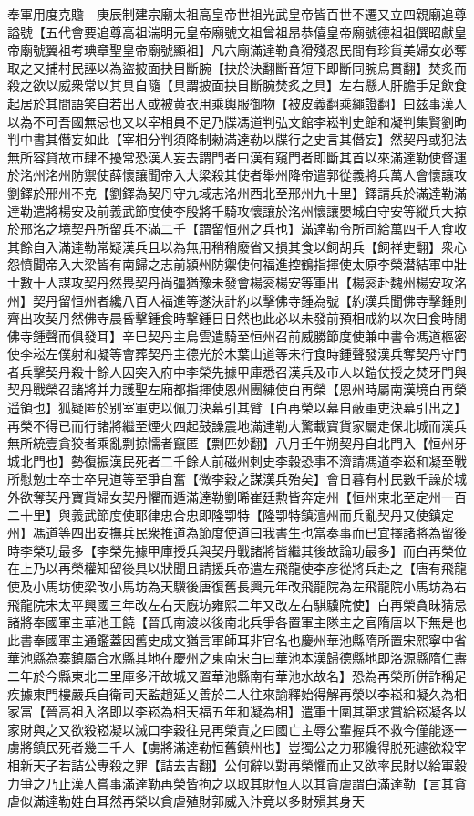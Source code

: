 奉軍用度克贍　庚辰制建宗廟太祖高皇帝世祖光武皇帝皆百世不遷又立四親廟追尊謚號【五代會要追尊高祖湍明元皇帝廟號文祖曾祖昂恭僖皇帝廟號德祖祖僎昭獻皇帝廟號翼祖考琠章聖皇帝廟號顯祖】凡六廟滿達勒貪猾殘忍民間有珍貨美婦女必奪取之又捕村民誣以為盜披面抉目斷腕【抉於決翻斷音短下即斷同腕烏貫翻】焚炙而殺之欲以威衆常以其具自隨【具謂披面抉目斷腕焚炙之具】左右懸人肝膽手足飲食起居於其間語笑自若出入或被黄衣用乘輿服御物【被皮義翻乘繩證翻】曰兹事漢人以為不可吾國無忌也又以宰相員不足乃牒馮道判弘文館李崧判史館和凝判集賢劉昫判中書其僭妄如此【宰相分判須降制勑滿達勒以牒行之史言其僭妄】然契丹或犯法無所容貸故市肆不擾常恐漢人妄去謂門者曰漢有窺門者即斷其首以來滿達勒使督運於洺州洺州防禦使薛懷讓聞帝入大梁殺其使者舉州降帝遣郭從義將兵萬人會懷讓攻劉鐸於邢州不克【劉鐸為契丹守九域志洺州西北至邢州九十里】鐸請兵於滿達勒滿達勒遣將楊安及前義武節度使李殷將千騎攻懷讓於洺州懷讓嬰城自守安等縱兵大掠於邢洺之境契丹所留兵不滿二千【謂留恒州之兵也】滿達勒令所司給萬四千人食收其餘自入滿達勒常疑漢兵且以為無用稍稍廢省又損其食以飼胡兵【飼祥吏翻】衆心怨憤聞帝入大梁皆有南歸之志前潁州防禦使何福進控鶴指揮使太原李榮潜結軍中壯士數十人謀攻契丹然畏契丹尚彊猶豫未發會楊衮楊安等軍出【楊衮赴魏州楊安攻洺州】契丹留恒州者纔八百人福進等遂決計約以擊佛寺鍾為號【約漢兵聞佛寺擊鍾則齊出攻契丹然佛寺晨昏擊鍾食時撃鍾日日然也此必以未發前預相戒約以次日食時閒佛寺鍾聲而俱發耳】辛巳契丹主烏雲遣騎至恒州召前威勝節度使兼中書令馮道樞密使李崧左僕射和凝等會葬契丹主德光於木葉山道等未行食時鍾聲發漢兵奪契丹守門者兵擊契丹殺十餘人因突入府中李榮先據甲庫悉召漢兵及市人以鎧仗授之焚牙門與契丹戰榮召諸將并力護聖左廂都指揮使恩州團練使白再榮【恩州時屬南漢境白再榮遥領也】狐疑匿於别室軍吏以佩刀決幕引其臂【白再榮以幕自蔽軍吏決幕引出之】再榮不得已而行諸將繼至煙火四起鼓譟震地滿達勒大驚載寶貨家屬走保北城而漢兵無所統壹貪狡者乘亂剽掠懦者竄匿【剽匹妙翻】八月壬午朔契丹自北門入【恒州牙城北門也】勢復振漢民死者二千餘人前磁州刺史李穀恐事不濟請馮道李崧和凝至戰所慰勉士卒士卒見道等至爭自奮【微李穀之謀漢兵殆矣】會日暮有村民數千譟於城外欲奪契丹寶貨婦女契丹懼而遁滿達勒劉晞崔廷勲皆奔定州【恒州東北至定州一百二十里】與義武節度使耶律忠合忠即隆卾特【隆卾特鎮澶州而兵亂契丹又使鎮定州】馮道等四出安撫兵民衆推道為節度使道曰我書生也當奏事而已宜擇諸將為留後時李榮功最多【李榮先據甲庫授兵與契丹戰諸將皆繼其後故論功最多】而白再榮位在上乃以再榮權知留後具以狀聞且請援兵帝遣左飛龍使李彦從將兵赴之【唐有飛龍使及小馬坊使梁改小馬坊為天驥後唐復舊長興元年改飛龍院為左飛龍院小馬坊為右飛龍院宋太平興國三年改左右天廐坊雍熙二年又改左右騏驥院使】白再榮貪昧猜忌諸將奉國軍主華池王饒【晉氏南渡以後南北兵爭各置軍主隊主之官隋唐以下無是也此書奉國軍主通鑑蓋因舊史成文猶言軍師耳非官名也慶州華池縣隋所置宋熙寧中省華池縣為寨鎮屬合水縣其地在慶州之東南宋白曰華池本漢歸德縣地即洛源縣隋仁夀二年於今縣東北二里庫多汗故城又置華池縣南有華池水故名】恐為再榮所併詐稱足疾據東門樓嚴兵自衛司天監趙延乂善於二人往來諭釋始得解再滎以李崧和凝久為相家富【晉高祖入洛即以李崧為相天福五年和凝為相】遣軍士圍其第求賞給崧凝各以家財與之又欲殺崧凝以滅口李穀往見再榮責之曰國亡主辱公輩握兵不救今僅能逐一虜將鎮民死者幾三千人【虜將滿達勒恒舊鎮州也】豈獨公之力邪纔得脱死遽欲殺宰相新天子若詰公專殺之罪【詰去吉翻】公何辭以對再榮懼而止又欲率民財以給軍穀力爭之乃止漢人嘗事滿達勒再榮皆拘之以取其財恒人以其貪虐謂白滿達勒【言其貪虐似滿達勒姓白耳然再榮以貪虐殖財郭威入汴竟以多財殞其身天